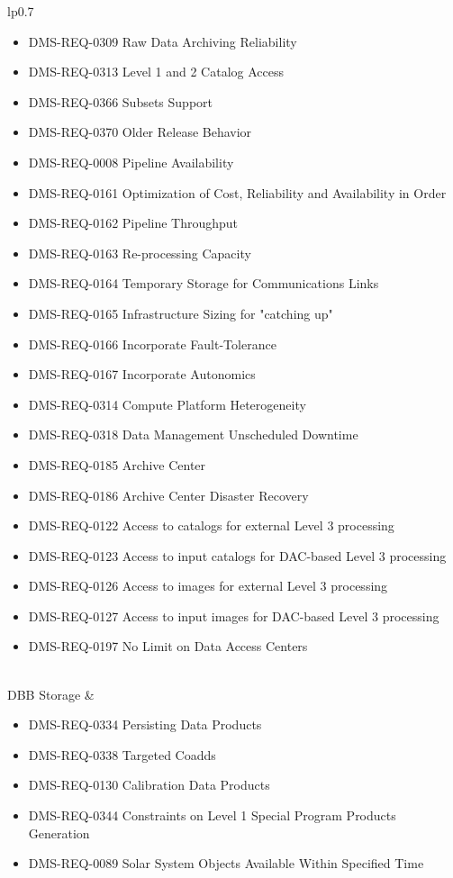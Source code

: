 \begin{xtabular}{lp{0.7\textwidth}}
\begin{itemize}
\item DMS-REQ-0309 Raw Data Archiving Reliability
\item DMS-REQ-0313 Level 1 and 2 Catalog Access
\item DMS-REQ-0366 Subsets Support
\item DMS-REQ-0370 Older Release Behavior
\item DMS-REQ-0008 Pipeline Availability
\item DMS-REQ-0161 Optimization of Cost, Reliability and Availability in Order
\item DMS-REQ-0162 Pipeline Throughput
\item DMS-REQ-0163 Re-processing Capacity
\item DMS-REQ-0164 Temporary Storage for Communications Links
\item DMS-REQ-0165 Infrastructure Sizing for "catching up"
\item DMS-REQ-0166 Incorporate Fault-Tolerance
\item DMS-REQ-0167 Incorporate Autonomics
\item DMS-REQ-0314 Compute Platform Heterogeneity
\item DMS-REQ-0318 Data Management Unscheduled Downtime
\item DMS-REQ-0185 Archive Center
\item DMS-REQ-0186 Archive Center Disaster Recovery
\item DMS-REQ-0122 Access to catalogs for external Level 3 processing
\item DMS-REQ-0123 Access to input catalogs for DAC-based Level 3 processing
\item DMS-REQ-0126 Access to images for external Level 3 processing
\item DMS-REQ-0127 Access to input images for DAC-based Level 3 processing
\item DMS-REQ-0197 No Limit on Data Access Centers
\end{itemize} \\ \hline
DBB Storage &
\begin{itemize}DMS-REQ-0346 Data Availability
\item DMS-REQ-0334 Persisting Data Products
\item DMS-REQ-0338 Targeted Coadds
\item DMS-REQ-0130 Calibration Data Products
\item DMS-REQ-0344 Constraints on Level 1 Special Program Products Generation
\item DMS-REQ-0089 Solar System Objects Available Within Specified Time

\end{itemize}
\end{xtabular}
